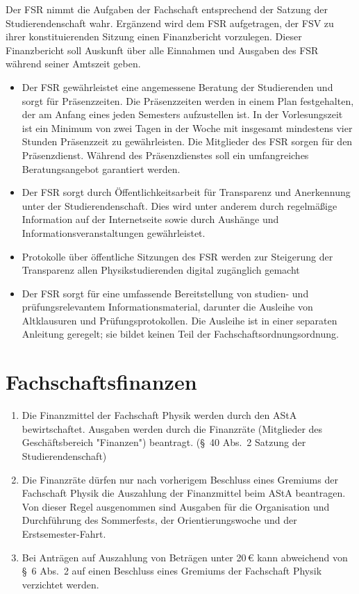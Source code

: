 \documentclass[
	a4paper,
	12pt,
	oneside,
	parskip=half-,
	pagesize,
	headsepline,
	german,
	ngerman
]{scrartcl}
\begin{document}
Der FSR nimmt die Aufgaben der Fachschaft entsprechend der Satzung der Studierendenschaft wahr. Ergänzend wird dem FSR aufgetragen, der FSV zu ihrer konstituierenden Sitzung einen Finanzbericht vorzulegen. Dieser Finanzbericht soll Auskunft über alle Einnahmen und Ausgaben des FSR während seiner Amtszeit geben.

\begin{itemize}
	\item Der FSR gewährleistet eine angemessene Beratung der Studierenden und sorgt für Präsenzzeiten. Die Präsenzzeiten werden in einem Plan festgehalten, der am Anfang eines jeden Semesters aufzustellen ist. In der Vorlesungszeit ist ein Minimum von zwei Tagen in der Woche mit insgesamt mindestens vier Stunden Präsenzzeit zu gewährleisten. Die Mitglieder des FSR sorgen für den Präsenzdienst. Während des Präsenzdienstes soll ein umfangreiches Beratungsangebot garantiert werden.
	\item Der FSR sorgt durch Öffentlichkeitsarbeit für Transparenz und Anerkennung unter der Studierendenschaft. Dies wird unter anderem durch regelmäßige Information auf der Internetseite sowie durch Aushänge und Informationsveranstaltungen gewährleistet.
	\item Protokolle über öffentliche Sitzungen des FSR werden zur Steigerung der Transparenz allen Physikstudierenden digital zugänglich gemacht
	\item Der FSR sorgt für eine umfassende Bereitstellung von studien- und prüfungsrelevantem Informationsmaterial, darunter die Ausleihe von Altklausuren und Prüfungsprotokollen. Die Ausleihe ist in einer separaten Anleitung geregelt; sie bildet keinen Teil der Fachschaftsordnungsordnung.
\end{itemize}


\section{Fachschaftsfinanzen}
\label{sec:Finanzen}

\begin{enumerate}
	\item Die Finanzmittel der Fachschaft Physik werden durch den AStA bewirtschaftet. Ausgaben werden durch die Finanzräte (Mitglieder des Geschäftsbereich "Finanzen") beantragt. (§~40 Abs.~2 Satzung der Studierendenschaft)
	\item Die Finanzräte dürfen nur nach vorherigem Beschluss eines Gremiums der Fachschaft Physik die Auszahlung der Finanzmittel beim AStA beantragen. Von dieser Regel ausgenommen sind Ausgaben für die Organisation und Durchführung des Sommerfests, der Orientierungswoche und der Erstsemester-Fahrt.
	\label{Finanzen_2}
	\item Bei Anträgen auf Auszahlung von Beträgen unter 20\,€ kann abweichend von §~6 Abs.~2 auf einen Beschluss eines Gremiums der Fachschaft Physik verzichtet werden.
\end{enumerate}
\end{document}
